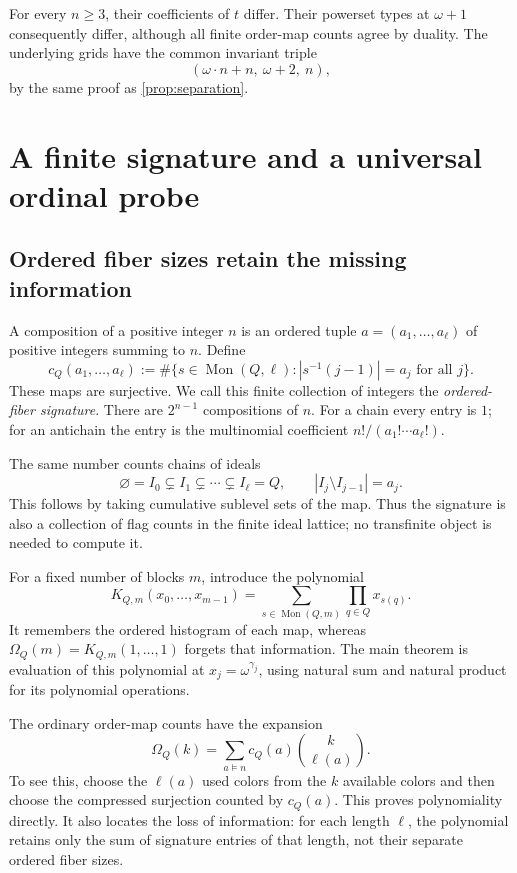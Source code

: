\documentclass[11pt,a4paper]{article}
\theoremstyle{definition}
\theoremstyle{remark}
\newcommand{\Mon}{\operatorname{Mon}}
\begin{document}
For every $n\geq3$, their coefficients of $t$ differ. Their powerset
types at $\omega+1$ consequently differ, although all finite order-map
counts agree by duality. The underlying grids have the common invariant
triple
\[
 (\omega\cdot n+n,\ \omega+2,\ n),
\]
by the same proof as \cref{prop:separation}.

\section{A finite signature and a universal ordinal probe}

\subsection{Ordered fiber sizes retain the missing information}
A composition of a positive integer $n$ is an ordered tuple
$a=(a_1,\ldots,a_\ell)$ of positive integers summing to $n$.
Define
\begin{equation}\label{eq:signature}
 c_Q(a_1,\ldots,a_\ell)
 :=\#\{s\in\Mon(Q,\ell): |s^{-1}(j-1)|=a_j\text{ for all }j\}.
\end{equation}
These maps are surjective. We call this finite collection of integers the
\emph{ordered-fiber signature}. There are $2^{n-1}$ compositions of $n$.
For a chain every entry is $1$; for an antichain the entry is the
multinomial coefficient $n!/(a_1!\cdots a_\ell!)$.

The same number counts chains of ideals
\[
 \varnothing=I_0\subsetneq I_1\subsetneq\cdots\subsetneq I_\ell=Q,
 \qquad |I_j\setminus I_{j-1}|=a_j.
\]
This follows by taking cumulative sublevel sets of the map. Thus the
signature is also a collection of flag counts in the finite ideal lattice;
no transfinite object is needed to compute it.

For a fixed number of blocks $m$, introduce the polynomial
\[
 K_{Q,m}(x_0,\ldots,x_{m-1})
 =\sum_{s\in\Mon(Q,m)}\prod_{q\in Q}x_{s(q)}.
\]
It remembers the ordered histogram of each map, whereas
$\Omega_Q(m)=K_{Q,m}(1,\ldots,1)$ forgets that information. The main theorem
is evaluation of this polynomial at $x_j=\omega^{\gamma_j}$, using natural
sum and natural product for its polynomial operations.

The ordinary order-map counts have the expansion
\begin{equation}\label{eq:orderpoly}
 \Omega_Q(k)=\sum_{a\vDash n}c_Q(a)\binom{k}{\ell(a)}.
\end{equation}
To see this, choose the $\ell(a)$ used colors from the $k$ available colors
and then choose the compressed surjection counted by $c_Q(a)$. This proves
polynomiality directly. It also locates the loss of information: for each
length $\ell$, the polynomial retains only the sum of signature entries
of that length, not their separate ordered fiber sizes.
\end{document}
